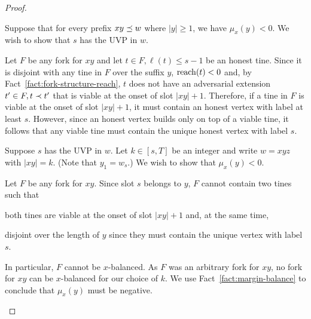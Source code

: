 \begin{proof}~

  \begin{description}[font=\normalfont\itshape\space]
    \item[The $\Longleftarrow$ direction.]
      Suppose that 
      for every prefix $xy \preceq w$ where $|y| \geq 1$, 
      we have $\mu_x(y) < 0$. 
      We wish to show that $s$ has the UVP in $w$.

      Let $F$ be any fork for $xy$ 
      and let 
      $t \in F, \ell(t) \leq s - 1$ be an honest tine. 
      Since it is disjoint with any tine in $F$ over the suffix $y$, 
      $\operatorname{reach}(t) < 0$ and, by Fact~\ref{fact:fork-structure-reach}, 
      $t$ does not have an adversarial extension $t' \in F, t \prec t'$ that is 
      viable at the onset of slot $|xy| + 1$. 
      Therefore, if a tine in $F$ 
      is viable at the onset of slot $|xy| + 1$, 
      it must contain an honest vertex with label at least $s$. 
      However, since an honest vertex builds only on top of a viable tine, 
      it follows that any viable tine must contain 
      the unique honest vertex with label $s$.

    \item[The $\Longrightarrow$ direction.]
      Suppose $s$ has the UVP in $w$.
      Let $k \in [s, T]$ be an integer and 
      write $w = xyz$ with $|xy| = k$. 
      (Note that $y_1 = w_s$.)
      We wish to show that $\mu_x(y) < 0$.

      Let $F$ be any fork for $xy$.
      Since slot $s$ belongs to $y$, 
      $F$ cannot contain two tines 
      such that 
      \begin{enumerate*}[label=(\roman*)]
        \item both tines are viable at the onset of slot $|xy| + 1$ 
        and, at the same time, 
        \item disjoint over the length of $y$ 
        since they must contain the unique vertex with label $s$. 
      \end{enumerate*}
      In particular, 
      $F$ cannot be $x$-balanced. 
      As $F$ was an arbitrary fork for $xy$, 
      no fork for $xy$ can be $x$-balanced for our choice of $k$.
      We use Fact~\ref{fact:margin-balance} 
      to conclude that 
      $\mu_x(y)$ must be negative.

  \end{description}
\end{proof}



